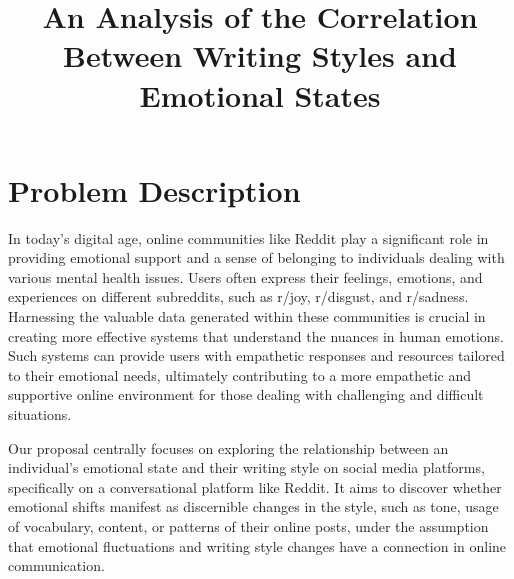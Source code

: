 \documentclass[conference,compsoc]{IEEEtran}
\begin{document}
\title{An Analysis of the Correlation Between Writing Styles and Emotional States}

\author{
\and
{}
}


\maketitle





\section{Problem Description}
In today's digital age, online communities like Reddit play a significant role in providing emotional support and a sense of belonging to individuals dealing with various mental health issues. Users often express their feelings, emotions, and experiences on different subreddits, such as r/joy, r/disgust, and r/sadness. Harnessing the valuable data generated within these communities is crucial in creating more effective systems that understand the nuances in human emotions. Such systems can provide users with empathetic responses and resources tailored to their emotional needs, ultimately contributing to a more empathetic and supportive online environment for those dealing with challenging and difficult situations.

Our proposal centrally focuses on exploring the relationship between an individual's emotional state and their writing style on social media platforms, specifically on a conversational platform like Reddit. It aims to discover whether emotional shifts manifest as discernible changes in the style, such as tone, usage of vocabulary, content, or patterns of their online posts, under the assumption that emotional fluctuations and writing style changes have a connection in online communication. 
\end{document}
